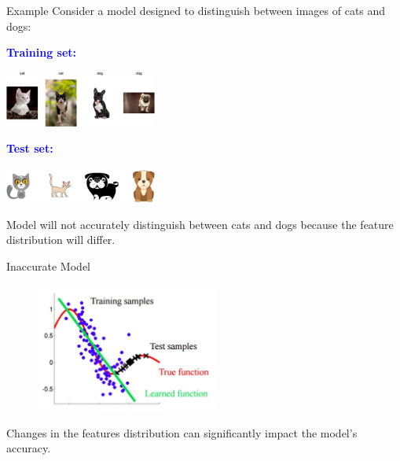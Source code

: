 \begin{frame}{Example}
	Consider a model designed to distinguish between images of cats and dogs:
	
	\vspace{0.5cm}
	\begin{minipage}[t]{0.55\textwidth} %
		\begin{flushleft}
			\textbf{\textcolor{blue}{Training set:}}
		\end{flushleft}
		\centering
		\includegraphics[width=5cm]{../assets/cat-dog-train.png}
		\label{fig:cani-gatti}
		\vspace{-0.2cm}
		\begin{flushleft}
			\textbf{\textcolor{blue}{Test set:}}
		\end{flushleft}
		\centering
		\includegraphics[width=5cm]{../assets/cat-dog-test.png}
		\label{fig:cani-gatti}
		
	\end{minipage}
	\hfill
	\begin{minipage}[t]{0.35\textwidth} %
		\vspace{0.2cm}
		\begin{tcolorbox}[colframe=blue!50!black, colback=blue!5, coltitle=black, sharp corners]
			Model will not accurately distinguish between cats and dogs because the feature distribution will differ.
		\end{tcolorbox}
	\end{minipage}
\end{frame}

\begin{frame}{Inaccurate Model}
	\begin{figure}[H]
		\centering
		\includegraphics[width=6cm]{../assets/inacurate_model.png}
		\label{fig:inacurate_model}
	\end{figure}
	Changes in the features distribution can significantly impact the model's accuracy.
\end{frame}


%  